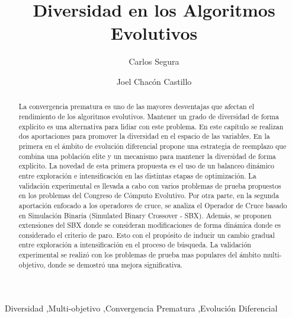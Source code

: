 \documentclass[review,3p]{elsarticle}
\begin{document}
\begin{frontmatter}

\title{Diversidad en los Algoritmos Evolutivos}

\author[label1]{Carlos Segura}

\author[label1]{Joel Chac\'on Castillo}


\address[label1]{Area of Computer Science, Centre for Research in Mathematics (CIMAT), Callej\'on Jalisco s/n, Mineral de Valenciana, Guanajuato, Guanajuato 36240, Mexico}

\begin{abstract}
La convergencia prematura es uno de las mayores desventajas que afectan el rendimiento de los algoritmos evolutivos.
%
Mantener un grado de diversidad de forma explícito es una alternativa para lidiar con este problema.
%
En este capítulo se realizan dos aportaciones para promover la diversidad en el espacio de las variables.
%
En la primera en el ámbito de evolución diferencial propone una estrategia de reemplazo que combina una población elite y un mecanismo para mantener la diversidad de forma explícito.
%
La novedad de esta primera propuesta es el uso de un balanceo dinámico entre exploración e intensificación en las distintas etapas de optimización.
%
La validación experimental es llevada a cabo con varios problemas de prueba propuestos en los problemas del Congreso de Cómputo Evolutivo.
%
Por otra parte, en la segunda aportación enfocado a los operadores de cruce, se analiza el Operador de Cruce basado en Simulación Binaria (Simulated Binary Crossover - SBX).
%
Además, se proponen extensiones del SBX donde se consideran modificaciones de forma dinámica donde es considerado el criterio de paro.
%
Esto con el propósito de inducir un cambio gradual entre exploración a intensificación en el proceso de búsqueda.
%
La validación experimental se realizó con los problemas de prueba mas populares del ámbito multi-objetivo, donde se demostró una mejora significativa.
%
\end{abstract}

\begin{keyword}
Diversidad \sep Multi-objetivo \sep Convergencia Prematura \sep Evolución Diferencial
\end{keyword}

\end{frontmatter}
\end{document}
